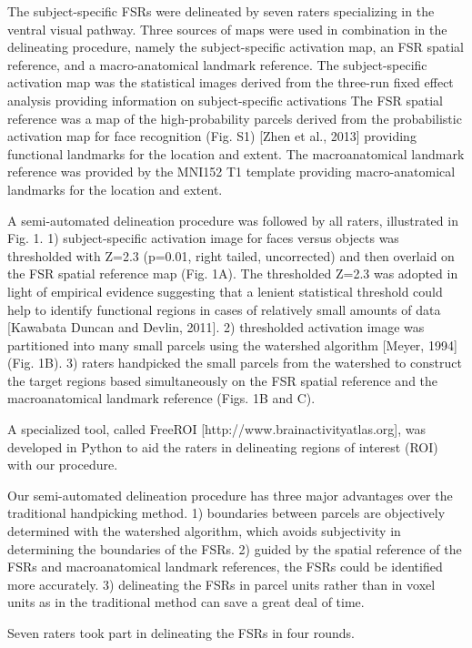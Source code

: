 The subject-specific FSRs were delineated by seven raters specializing in the
ventral visual pathway.
%
Three sources of maps were used in combination in the delineating procedure,
namely the subject-specific activation map, an FSR spatial reference, and a
macro-anatomical landmark reference.
%
The subject-specific activation map was the statistical images derived from the
three-run fixed effect analysis providing information on subject-specific
activations
%
The FSR spatial reference was a map of the high-probability parcels derived from
the probabilistic activation map for face recognition (Fig. S1) [Zhen et al.,
2013] providing functional landmarks for the location and extent.
%
The macroanatomical landmark reference was provided by the MNI152 T1 template
providing macro-anatomical landmarks for the location and extent.

%
A semi-automated delineation procedure was followed by all raters, illustrated
in Fig. 1.
%
1) subject-specific activation image for faces versus objects was
thresholded with Z=2.3 (p=0.01, right tailed, uncorrected) and then overlaid
on the FSR spatial reference map (Fig. 1A).
%
The thresholded Z=2.3 was adopted in light of empirical evidence suggesting
that a lenient statistical threshold could help to identify functional regions
in cases of relatively small amounts of data [Kawabata Duncan and Devlin, 2011].
%
2) thresholded activation image was partitioned into many small parcels
using the watershed algorithm [Meyer, 1994](Fig. 1B).
%
3) raters handpicked the small parcels from the watershed to construct
the target regions based simultaneously on the FSR spatial reference and the
macroanatomical landmark reference (Figs. 1B and C).

%
A specialized tool, called FreeROI [http://www.brainactivityatlas.org], was
developed in Python to aid the raters in delineating regions of interest (ROI)
with our procedure.

%
Our semi-automated delineation procedure has three major advantages over the
traditional handpicking method.
%
1) boundaries between parcels are objectively determined with the
watershed algorithm, which avoids subjectivity in determining the boundaries of
the FSRs.
%
2) guided by the spatial reference of the FSRs and macroanatomical landmark
references, the FSRs could be identified more accurately.
%
3) delineating the FSRs in parcel units rather than in voxel units as in the
traditional method can save a great deal of time.

%
Seven raters took part in delineating the FSRs in four rounds.

